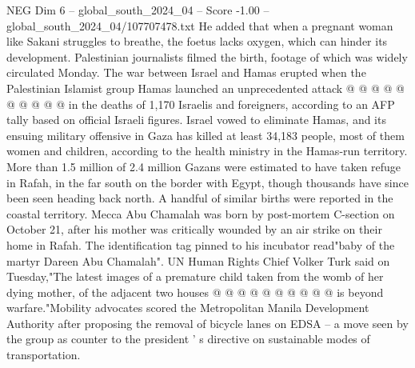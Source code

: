 \begin{textsample}{NEG Dim 6 – global\_south\_2024\_04 – Score -1.00 – global\_south\_2024\_04/107707478.txt}
He added that when a pregnant woman like Sakani struggles to breathe, the foetus lacks oxygen, which can hinder its development.
Palestinian journalists filmed the birth, footage of which was widely circulated Monday.
The war between Israel and Hamas erupted when the Palestinian Islamist group Hamas launched an unprecedented attack @ @ @ @ @ @ @ @ @ @ in the deaths of 1,170 Israelis and foreigners, according to an AFP tally based on official Israeli figures.
Israel vowed to eliminate Hamas, and its ensuing military offensive in Gaza has killed at least 34,183 people, most of them women and children, according to the health ministry in the Hamas-run territory.
More than 1.5 million of 2.4 million Gazans were estimated to have taken refuge in Rafah, in the far south on the border with Egypt, though thousands have since been seen heading back north.
A handful of similar births were reported in the coastal territory.
Mecca Abu Chamalah was born by post-mortem C-section on October 21, after his mother was critically wounded by an air strike on their home in Rafah.
The identification tag pinned to his incubator read"baby of the martyr Dareen Abu Chamalah".
UN Human Rights Chief Volker Turk said on Tuesday,"The latest images of a premature child taken from the womb of her dying mother, of the adjacent two houses @ @ @ @ @ @ @ @ @ @ is beyond warfare."Mobility advocates scored the Metropolitan Manila Development Authority after proposing the removal of bicycle lanes on EDSA -- a move seen by the group as counter to the president ' s directive on sustainable modes of transportation.

\end{textsample}
